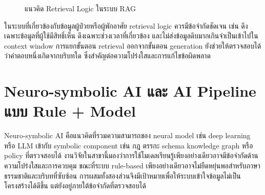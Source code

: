 \begin{figure}[htbp]
    \centering
    \caption{แนวคิด Retrieval Logic ในระบบ RAG}
    \label{fig:ch2_rag_pipeline}
\end{figure}

ในระบบที่เกี่ยวข้องกับข้อมูลผู้ป่วยหรือผู้พักอาศัย retrieval logic ควรมีข้อจำกัดชัดเจน เช่น ดึงเฉพาะข้อมูลที่ผู้ใช้มีสิทธิ์เห็น ดึงเฉพาะช่วงเวลาที่เกี่ยวข้อง และไม่ส่งข้อมูลดิบมากเกินจำเป็นเข้าไปใน context window การแยกขั้นตอน retrieval ออกจากขั้นตอน generation ยังช่วยให้ตรวจสอบได้ว่าคำตอบหนึ่งเกิดจากบริบทใด ซึ่งสำคัญต่อความโปร่งใสและการแก้ไขข้อผิดพลาด

\section{Neuro-symbolic AI และ AI Pipeline แบบ Rule + Model}
\label{sec:ch2_neuro_symbolic_pipeline}

Neuro-symbolic AI คือแนวคิดที่รวมความสามารถของ neural model เช่น deep learning หรือ LLM เข้ากับ symbolic component เช่น กฎ ตรรกะ schema knowledge graph หรือ policy ที่ตรวจสอบได้ งานวิจัยในสาขานี้มองว่าการใช้โมเดลเรียนรู้เพียงอย่างเดียวอาจมีข้อจำกัดด้านความโปร่งใสและการควบคุม ขณะที่ระบบ rule-based เพียงอย่างเดียวอาจไม่ยืดหยุ่นพอสำหรับภาษาธรรมชาติและบริบทที่ซับซ้อน การผสมทั้งสองส่วนจึงมีเป้าหมายเพื่อให้ระบบเข้าใจข้อมูลไม่เป็นโครงสร้างได้ดีขึ้น แต่ยังอยู่ภายใต้ข้อจำกัดที่ตรวจสอบได้ \cite{Susskind2021NeuroSymbolic,ColeloughRegli2025NeuroSymbolic}

